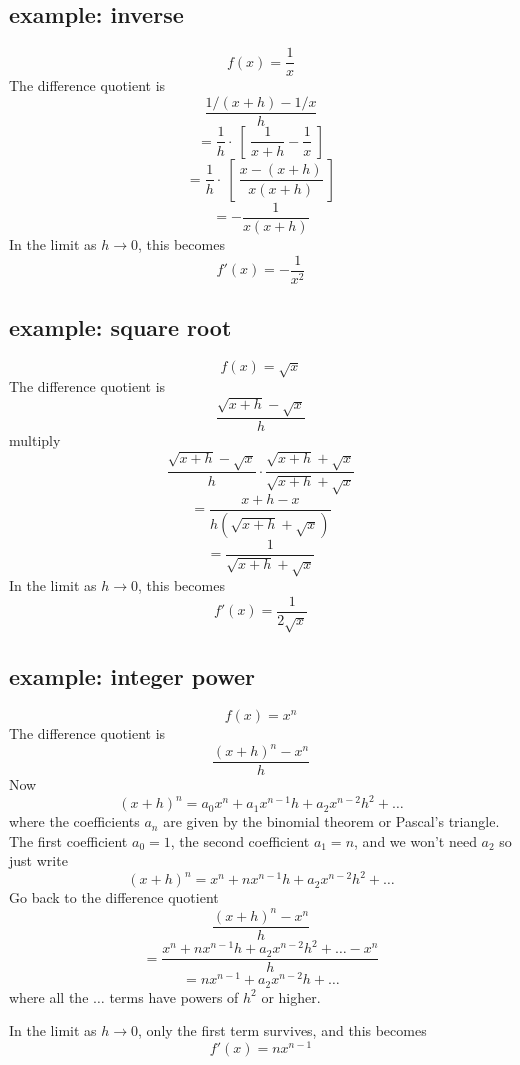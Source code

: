 \documentclass[11pt, oneside]{article}   	%
\begin{document}
\subsection*{example:  inverse}
\[ f(x) = \frac{1}{x} \]
The difference quotient is
\[ \frac{1/(x+h) - 1/x}{h} \]
\[ = \frac{1}{h} \cdot \ [ \ \frac{1}{x+h} - \frac{1}{x} \ ] \]
\[ = \frac{1}{h} \cdot \ [ \ \frac{x - (x + h)}{x(x+h)}  \ ] \]
\[ = - \frac{1}{x(x+h) }\]
In the limit as $h \rightarrow 0$, this becomes
\[ f'(x) = -\frac{1}{x^2} \]

\subsection*{example:  square root}
\[ f(x) = \sqrt{x} \]
The difference quotient is
\[ \frac{\sqrt{x + h} - \sqrt{x}}{h} \]
multiply
\[ \frac{\sqrt{x + h} - \sqrt{x}}{h} \cdot \frac{\sqrt{x + h} + \sqrt{x}}{\sqrt{x + h} + \sqrt{x}}\]
\[ = \frac{x + h - x}{h(\sqrt{x + h} + \sqrt{x})} \]
\[ = \frac{1}{\sqrt{x + h} + \sqrt{x}} \]
In the limit as $h \rightarrow 0$, this becomes
\[ f'(x) = \frac{1}{2 \sqrt{x}} \]

\subsection*{example:  integer power}
\[ f(x) = x^n \]
The difference quotient is
\[ \frac{(x+h)^n - x^n}{h} \]
Now
\[ (x+h)^n = a_0 x^n + a_1 x^{n-1} h + a_2 x^{n-2}h^2 + \dots \]
where the coefficients $a_n$ are given by the binomial theorem or Pascal's triangle.  The first coefficient $a_0 = 1$, the second coefficient $a_1 = n$, and we won't need $a_2$ so just write
\[ (x+h)^n = x^n + n x^{n-1} h + a_2 x^{n-2}h^2 + \dots \]
Go back to the difference quotient
\[ \frac{(x+h)^n - x^n}{h} \]
\[ = \frac{x^n + n x^{n-1} h + a_2 x^{n-2}h^2 + \dots - x^n}{h} \]
\[ = n x^{n-1} + a_2 x^{n-2}h + \dots \]
where all the $\dots$ terms have powers of $h^2$ or higher.

In the limit as $h \rightarrow 0$, only the first term survives, and this becomes
\[ f'(x) = n x^{n-1} \]
\end{document}

